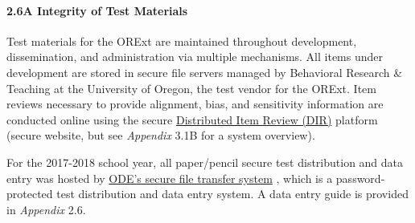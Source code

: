 \documentclass[]{article}
\let\oldparagraph\paragraph
\renewcommand{\paragraph}[1]{\oldparagraph{#1}\mbox{}}
\begin{document}
\paragraph{2.6A Integrity of Test
Materials}\label{a-integrity-of-test-materials}

Test materials for the ORExt are maintained throughout development,
dissemination, and administration via multiple mechanisms. All items
under development are stored in secure file servers managed by
Behavioral Research \& Teaching at the University of Oregon, the test
vendor for the ORExt. Item reviews necessary to provide alignment, bias,
and sensitivity information are conducted online using the secure
\color{link}\href{http://brtitemreview.com}{Distributed Item Review
(DIR)}\color{black} platform (secure website, but see \emph{Appendix}
3.1B for a system overview).

For the 2017-2018 school year, all paper/pencil secure test distribution
and data entry was hosted by
\color{link}\href{https://district.ode.state.or.us/apps/login/}{ODE's
secure file transfer system} \color {black}, which is a
password-protected test distribution and data entry system. A data entry
guide is provided in \emph{Appendix} 2.6.
\end{document}
